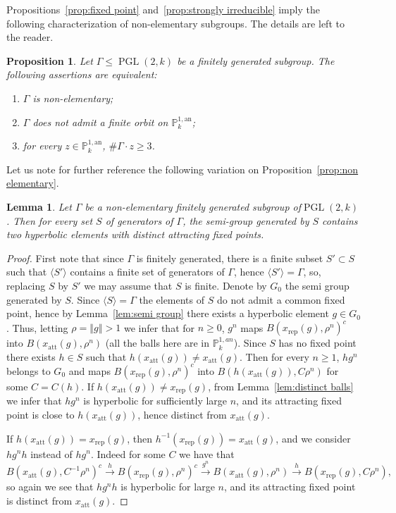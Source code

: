 \documentclass[10pt]{amsart}
\newtheorem{lemm}[theo]{Lemma}\newtheorem{prop}[theo]{Proposition}\newtheorem{coro}[theo]{Corollary}\newtheorem{conj}[theo]{Conjecture}
\theoremstyle{definition}\newtheorem{defi}[theo]{Definition}\newtheorem{rema}[theo]{Remark}\newtheorem{exam}[theo]{Example}\newtheorem{exem}[theo]{Example}\newtheorem{nota}[theo]{Notation}
\DeclareMathOperator{\PGL}{PGL}
\newcommand{\norm}[1]{\left\Vert#1\right\Vert}
\newcommand{\PP}{\mathbb{P}}
\newcommand{\att}{\mathrm{att}}
\newcommand{\rep}{\mathrm{rep}}
\newcommand{\PGLk}{\PGL(2, k)}
\newcommand{\inv}{^{-1}}
\begin{document}
Propositions~\ref{prop:fixed point} and~\ref{prop:strongly irreducible} imply the following characterization of non-elementary subgroups. The details are left to the reader.

\begin{prop}
Let $\Gamma\leq \PGLk$ be a finitely generated subgroup. The following assertions are equivalent:
\begin{enumerate}
\item $\Gamma$ is non-elementary;
\item $\Gamma$ does not admit a finite orbit on $\PP^{1, \mathrm{an}}_k$;
\item for every $z\in \PP^{1, \mathrm{an}}_k$, $\# \Gamma \cdot z\geq 3$.
\end{enumerate}
\end{prop}

Let us note for further reference the following variation on Proposition~\ref{prop:non elementary}.

\begin{lemm}\label{lem:proximal semi group}
Let $\Gamma$ be a non-elementary finitely generated subgroup of\linebreak $\PGLk$. Then for every set $S$ of generators of $\Gamma$, the semi-group generated by $S$ contains two hyperbolic elements with distinct attracting fixed points.
\end{lemm}

\begin{proof}
First note that since $\Gamma$ is finitely generated, there is a finite subset $S'\subset S$ such that $\langle S'\rangle$ contains a finite set of generators of $\Gamma$, hence $\langle S'\rangle = \Gamma$, so, replacing $S$ by $S'$ we may assume that $S$ is finite. Denote by $G_0$ the semi group generated by $S$. Since $\langle S\rangle = \Gamma$ the elements of $S$ do not admit a common fixed point, hence by Lemma~\ref{lem:semi group} there exists a hyperbolic element $g\in G_0$. Thus, letting $\rho = \norm{g}>1$ we infer that for $n\geq 0$, $g^n$ maps $B(x_\rep(g), \rho^n)^c$ into $B(x_\att(g), \rho^n)$ (all the balls here are in $\PP^{1, an}_k$). Since $S$ has no fixed point there exists $h\in S$ such that $h(x_\att(g))\neq x_\att(g)$. Then for every $n\geq 1$, $hg^n$ belongs to $G_0$ and maps $B(x_\rep(g), \rho^n)^c$ into $B(h(x_\att(g)), C\rho^n)$ for some $C = C(h)$. If $h(x_\att(g))\neq x_\rep(g)$, from Lemma~\ref{lem:distinct balls} we infer that $hg^n$ is hyperbolic for sufficiently large $n$, and its attracting fixed point is close to $h(x_\att(g))$, hence distinct from $x_\att(g)$.

If $h(x_\att(g))= x_\rep(g)$, then $h\inv(x_\rep(g)) =x_\att(g)$, and we consider $hg^n h$ instead of $hg^n$. Indeed for some $C$ we have that
\[
B(x_\att(g), C\inv\rho^n)^c\overset{h}\longrightarrow B(x_\rep(g), \rho^n)^c\overset{g^n}\longrightarrow B(x_\att(g), \rho^n)
\overset{h}\longrightarrow B(x_\rep(g), C \rho^n),
\]
so again we see that $hg^nh$ is hyperbolic for large $n$, and its attracting fixed point is distinct from $x_\att(g)$.
\end{proof}
\end{document}
